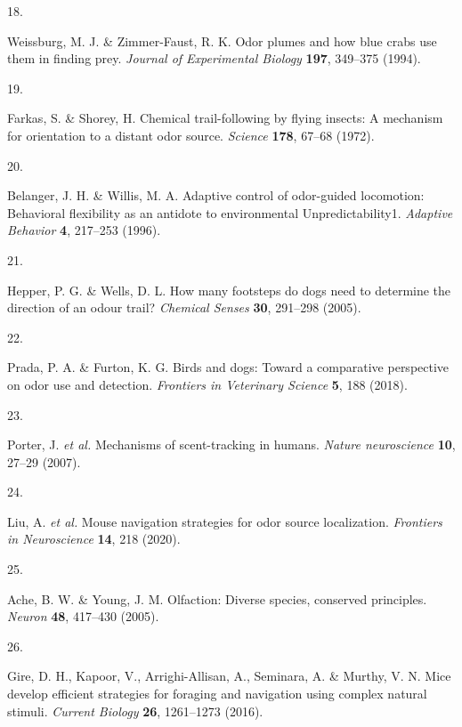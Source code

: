 \documentclass[
]{article}
\newlength{\cslhangindent}
\newlength{\csllabelwidth}
\newlength{\cslentryspacingunit} %
\newenvironment{CSLReferences}[2] %
 {%
  \setlength{\parindent}{0pt}
  \ifodd #1
  \let\oldpar\par
  \def\par{\hangindent=\cslhangindent\oldpar}
  \fi
  \setlength{\parskip}{#2\cslentryspacingunit}
 }%
 {}
\newcommand{\CSLLeftMargin}[1]{\parbox[t]{\csllabelwidth}{#1}}
\newcommand{\CSLRightInline}[1]{\parbox[t]{\linewidth - \csllabelwidth}{#1}\break}
\begin{document}
\begin{CSLReferences}{0}{0}
\leavevmode{}%
\CSLLeftMargin{18. }%
\CSLRightInline{Weissburg, M. J. \& Zimmer-Faust, R. K. Odor plumes and how blue crabs use them in finding prey. \emph{Journal of Experimental Biology} \textbf{197}, 349--375 (1994).}

\leavevmode{}%
\CSLLeftMargin{19. }%
\CSLRightInline{Farkas, S. \& Shorey, H. Chemical trail-following by flying insects: A mechanism for orientation to a distant odor source. \emph{Science} \textbf{178}, 67--68 (1972).}

\leavevmode{}%
\CSLLeftMargin{20. }%
\CSLRightInline{Belanger, J. H. \& Willis, M. A. Adaptive control of odor-guided locomotion: Behavioral flexibility as an antidote to environmental Unpredictability1. \emph{Adaptive Behavior} \textbf{4}, 217--253 (1996).}

\leavevmode{}%
\CSLLeftMargin{21. }%
\CSLRightInline{Hepper, P. G. \& Wells, D. L. How many footsteps do dogs need to determine the direction of an odour trail? \emph{Chemical Senses} \textbf{30}, 291--298 (2005).}

\leavevmode{}%
\CSLLeftMargin{22. }%
\CSLRightInline{Prada, P. A. \& Furton, K. G. Birds and dogs: Toward a comparative perspective on odor use and detection. \emph{Frontiers in Veterinary Science} \textbf{5}, 188 (2018).}

\leavevmode{}%
\CSLLeftMargin{23. }%
\CSLRightInline{Porter, J. \emph{et al.} Mechanisms of scent-tracking in humans. \emph{Nature neuroscience} \textbf{10}, 27--29 (2007).}

\leavevmode{}%
\CSLLeftMargin{24. }%
\CSLRightInline{Liu, A. \emph{et al.} Mouse navigation strategies for odor source localization. \emph{Frontiers in Neuroscience} \textbf{14}, 218 (2020).}

\leavevmode{}%
\CSLLeftMargin{25. }%
\CSLRightInline{Ache, B. W. \& Young, J. M. Olfaction: Diverse species, conserved principles. \emph{Neuron} \textbf{48}, 417--430 (2005).}

\leavevmode{}%
\CSLLeftMargin{26. }%
\CSLRightInline{Gire, D. H., Kapoor, V., Arrighi-Allisan, A., Seminara, A. \& Murthy, V. N. Mice develop efficient strategies for foraging and navigation using complex natural stimuli. \emph{Current Biology} \textbf{26}, 1261--1273 (2016).}


\end{CSLReferences}
\end{document}
